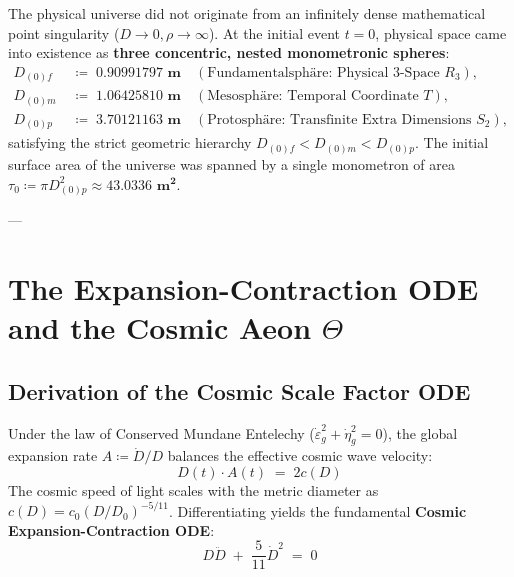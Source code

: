 \documentclass[
    12pt,
    a4paper,
    headings=normal,
    twoside=false,
    open=any,
    parskip=half
]{scrbook}
\begin{document}
\begin{phystheorem}\label{thm:ch7_primordial_sphere_trinity}
The physical universe did not originate from an infinitely dense mathematical point singularity ($D \to 0, \rho \to \infty$).
At the initial event $t = 0$, physical space came into existence as \textbf{three concentric, nested monometronic spheres}:
\begin{equation}
\begin{aligned}
D_{(0)f} &\;\coloneqq\; \mathbf{0.90991797 \text{ m}} \quad (\text{Fundamentalsph\"are: Physical 3-Space } R_3), \\
D_{(0)m} &\;\coloneqq\; \mathbf{1.06425810 \text{ m}} \quad (\text{Mesosph\"are: Temporal Coordinate } T), \\
D_{(0)p} &\;\coloneqq\; \mathbf{3.70121163 \text{ m}} \quad (\text{Protosph\"are: Transfinite Extra Dimensions } S_2),
\end{aligned}
\label{eq:ch7_sphere_trinity_clean}
\end{equation}
satisfying the strict geometric hierarchy $D_{(0)f} < D_{(0)m} < D_{(0)p}$. The initial surface area of the universe was spanned by a single monometron of area $\tau_0 \coloneqq \pi D_{(0)p}^2 \approx \mathbf{43.0336 \text{ m}^2}$.
\end{phystheorem}

---

\section{The Expansion-Contraction ODE and the Cosmic Aeon $\Theta$}
\label{sec:ch7_expansion_ode_aeon}

\subsection{Derivation of the Cosmic Scale Factor ODE}

Under the law of Conserved Mundane Entelechy ($\dot{\varepsilon}_g^2 + \dot{\eta}_g^2 = 0$), the global expansion rate $A \coloneqq \dot{D}/D$ balances the effective cosmic wave velocity:
\begin{equation}
D(t) \cdot A(t) \;=\; 2 c(D)
\end{equation}
The cosmic speed of light scales with the metric diameter as $c(D) = c_0 (D/D_0)^{-5/11}$. Differentiating yields the fundamental \textbf{Cosmic Expansion-Contraction ODE}:
\begin{equation}
\boxed{D \ddot{D} \;+\; \frac{5}{11} \dot{D}^2 \;=\; 0}
\label{eq:ch7_expansion_ode_master}
\end{equation}
\end{document}
